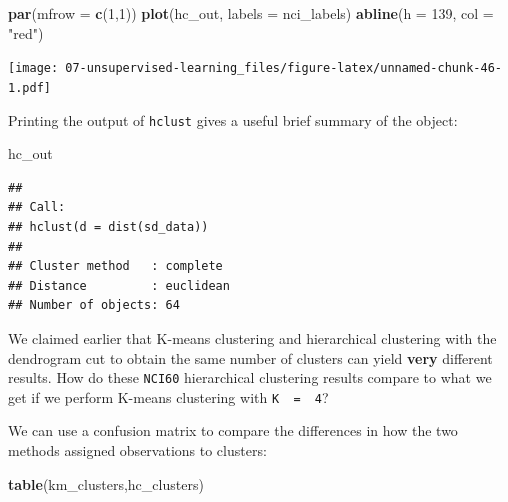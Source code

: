 \documentclass[
  openany]{book}
\newenvironment{Shaded}{\begin{snugshade}}{\end{snugshade}}
\newcommand{\DataTypeTok}[1]{\textcolor[rgb]{0.13,0.29,0.53}{#1}}
\newcommand{\DecValTok}[1]{\textcolor[rgb]{0.00,0.00,0.81}{#1}}
\newcommand{\KeywordTok}[1]{\textcolor[rgb]{0.13,0.29,0.53}{\textbf{#1}}}
\newcommand{\NormalTok}[1]{#1}
\newcommand{\OperatorTok}[1]{\textcolor[rgb]{0.81,0.36,0.00}{\textbf{#1}}}
\newcommand{\StringTok}[1]{\textcolor[rgb]{0.31,0.60,0.02}{#1}}
\begin{document}
\begin{Shaded}
\begin{Highlighting}[]
\KeywordTok{par}\NormalTok{(}\DataTypeTok{mfrow =} \KeywordTok{c}\NormalTok{(}\DecValTok{1}\NormalTok{,}\DecValTok{1}\NormalTok{))}
\KeywordTok{plot}\NormalTok{(hc_out, }\DataTypeTok{labels =}\NormalTok{ nci_labels)}
\KeywordTok{abline}\NormalTok{(}\DataTypeTok{h =} \DecValTok{139}\NormalTok{, }\DataTypeTok{col =} \StringTok{"red"}\NormalTok{)}
\end{Highlighting}
\end{Shaded}

\texttt{[image: 07-unsupervised-learning\_files/figure-latex/unnamed-chunk-46-1.pdf]}

Printing the output of \texttt{hclust} gives a useful brief summary of the object:

\begin{Shaded}
\begin{Highlighting}[]
\NormalTok{hc_out}
\end{Highlighting}
\end{Shaded}

\begin{verbatim}
## 
## Call:
## hclust(d = dist(sd_data))
## 
## Cluster method   : complete 
## Distance         : euclidean 
## Number of objects: 64
\end{verbatim}

We claimed earlier that K-means clustering and hierarchical
clustering with the dendrogram cut to obtain the same number
of clusters can yield \textbf{very} different results. How do these \texttt{NCI60} hierarchical
clustering results compare to what we get if we perform K-means clustering
with \texttt{K\ \ =\ \ 4}?

\begin{Shaded}
\end{Shaded}

We can use a confusion matrix to compare the differences in how the two methods assigned observations to clusters:

\begin{Shaded}
\begin{Highlighting}[]
\KeywordTok{table}\NormalTok{(km_clusters,hc_clusters)}
\end{Highlighting}
\end{Shaded}
\end{document}
